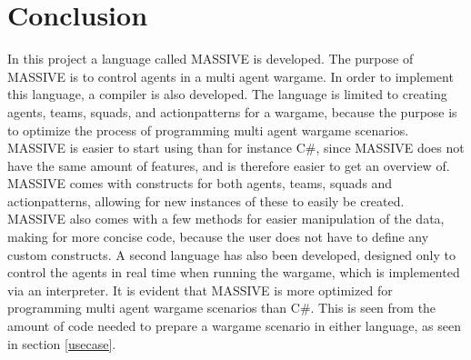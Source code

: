 \chapter{Conclusion}

In this project a language called MASSIVE is developed. The purpose of MASSIVE is to control agents in a multi agent wargame. In order to implement this language, a compiler is also developed. 
The language is limited to creating agents, teams, squads, and actionpatterns for a wargame, because the purpose is to optimize the process of programming multi agent wargame scenarios. MASSIVE is easier to start using than for instance C\#, since MASSIVE does not have the same amount of features, and is therefore easier to get an overview of.
MASSIVE comes with constructs for both agents, teams, squads and actionpatterns, allowing for new instances of these to easily be created. MASSIVE also comes with a few methods for easier manipulation of the data, making for more concise code, because the user does not have to define any custom constructs.
A second language has also been developed, designed only to control the agents in real time when running the wargame, which is implemented via an interpreter.
It is evident that MASSIVE is more optimized for programming multi agent wargame scenarios than C\#. This is seen from the amount of code needed to prepare a wargame scenario in either language, as seen in section \ref{usecase}.
